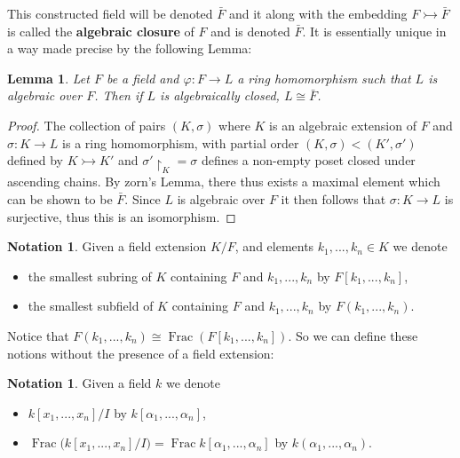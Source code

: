 \documentclass[12pt]{article}
\theoremstyle{plain}
\newtheorem{lemma}[thm]{Lemma}
\theoremstyle{definition}
\newtheorem{notation}[thm]{Notation}
\begin{document}
This constructed field will be denoted $\bar{F}$ and it along with the embedding $F \rightarrowtail \bar{F}$ is called the \textbf{algebraic closure} of $F$ and is denoted $\bar{F}$. It is essentially unique in a way made precise by the following Lemma:
\begin{lemma}
Let $F$ be a field and $\varphi: F \to L$ a ring homomorphism such that $L$ is algebraic over  $F$. Then if $L$ is algebraically closed, $L \cong \bar{F}$.
\end{lemma}
\begin{proof}
The collection of pairs $(K,\sigma)$ where $K$ is an algebraic extension of $F$ and $\sigma: K \to L$ is a ring homomorphism, with partial order $(K,\sigma) < (K',\sigma')$ defined by $K \rightarrowtail K'$ and $\sigma'\restriction_{K} = \sigma$ defines a non-empty poset closed under ascending chains. By zorn's Lemma, there thus exists a maximal element which can be shown to be $\bar{F}$. Since $L$ is algebraic over $F$ it then follows that $\sigma: K \to L$ is surjective, thus this is an isomorphism.
\end{proof}
\begin{notation}
Given a field extension $K/F$, and elements $k_1,...,k_n \in K$ we denote
\begin{itemize}
    \item the smallest subring of $K$ containing $F$ and $k_1,...,k_n$ by $F[k_1,...,k_n]$,
    \item the smallest subfield of $K$ containing $F$ and $k_1,...,k_n$ by $F(k_1,...,k_n)$.
\end{itemize}
\end{notation}
Notice that $F(k_1,...,k_n) \cong \operatorname{Frac}(F[k_1,...,k_n])$. So we can define these notions without the presence of a field extension:
\begin{notation}
\label{not:smstring_smstfield_noext}
Given a field $k$ we denote
\begin{itemize}
    \item $k[x_1,...,x_n]/I$ by $k[\alpha_1,...,\alpha_n]$,
    \item $\operatorname{Frac}\big(k[x_1,...,x_n]/I\big) = \operatorname{Frac}k[\alpha_1,...,\alpha_n]$ by $k(\alpha_1,...,\alpha_n)$.
\end{itemize}
\end{notation}
\end{document}
